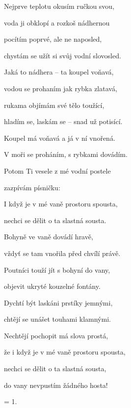 

\zs
Nejprve teplotu okusím ručkou svou,

voda ji obklopí a rozkoš nádhernou

pocítím poprvé, ale ne naposled,

chystám se užít si svůj vodní slovosled.
\ks

\zs
Jaká to nádhera -- ta koupel voňavá,

vodou se prohaním jak rybka zlatavá,

rukama objímám své tělo toužící,

hladím se, laskám se -- snad už potisící.
\ks

\zr
Koupel má voňavá a já v ní vnořená.

V moři se proháním, s rybkami dovádím.

Potom Ti vesele z mé vodní postele

zazpívám písničku: 
\kr

\zs
I když je v mé vaně prostoru spousta, 

nechci se dělit o ta slastná sousta.

Bohyně ve vaně dovádí hravě,

vždyť se tam vnořila před chvílí právě.
\ks

\zs
Poutníci touží jít s bohyní do vany,

objevit ukryté kouzelné fontány.

Dychtí být laskáni prstíky jemnými,

chtějí se unášet touhami klamnými.
\ks

\zs
Nechtějí pochopit má slova prostá,

že i když je v mé vaně prostoru spousta,

nechci se dělit o ta slastná sousta,

do vany nevpustím žádného hosta!
\ks

\zr
\kr

\zs
= 1.
\ks

\kp
